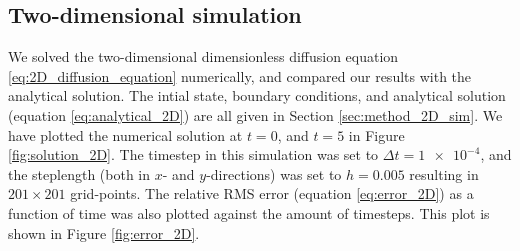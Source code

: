 \documentclass[reprint,english,notitlepage]{revtex4-1}  %
\begin{document}
\subsection{Two-dimensional simulation} \label{sec:results_2D}

We solved the two-dimensional dimensionless diffusion equation \eqref{eq:2D_diffusion_equation} numerically, and compared our results with the analytical solution. The intial state, boundary conditions, and analytical solution (equation \eqref{eq:analytical_2D}) are all given in Section \ref{sec:method_2D_sim}. We have plotted the numerical solution at $t=0$, and $t=5$ in Figure \ref{fig:solution_2D}. The timestep in this simulation was set to $\Delta t = \num{1e-4}$, and the steplength (both in $x$- and $y$-directions) was set to $h = 0.005$ resulting in \(201\times 201\) grid-points. The relative RMS error (equation \eqref{eq:error_2D}) as a function of time was also plotted against the amount of timesteps. This plot is shown in Figure \ref{fig:error_2D}.
\end{document}
